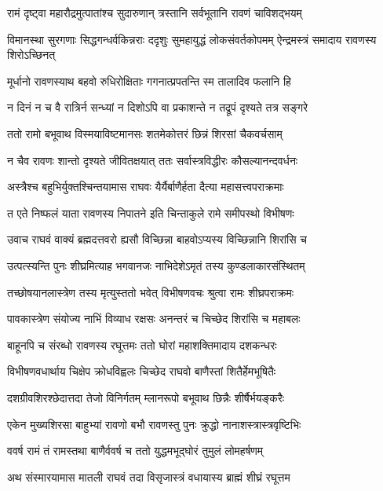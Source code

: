 \twolineshloka
{रामं दृष्ट्वा महारौद्रमुत्पातांश्च सुदारुणान्}
{त्रस्तानि सर्वभूतानि रावणं चाविशद्भयम्} %

\threelineshloka
{विमानस्था सुरगणाः सिद्धगन्धर्वकिन्नराः}
{ददृशुः सुमहायुद्धं लोकसंवर्तकोपमम्}
{ऐन्द्रमस्त्रं समादाय रावणस्य शिरोऽच्छिनत्} %

\twolineshloka
{मूर्धानो रावणस्याथ बहवो रुधिरोक्षिताः}
{गगनात्प्रपतन्ति स्म तालादिव फलानि हि} %

\twolineshloka
{न दिनं न च वै रात्रिर्न सन्ध्यां न दिशोऽपि वा}
{प्रकाशन्ते न तद्रूपं दृश्यते तत्र सङ्गरे} %

\twolineshloka
{ततो रामो बभूवाथ विस्मयाविष्टमानसः}
{शतमेकोत्तरं छिन्नं शिरसां चैकवर्चसाम्} %

\twolineshloka
{न चैव रावणः शान्तो दृश्यते जीवितक्षयात्}
{ततः सर्वास्त्रविद्धीरः कौसल्यानन्दवर्धनः} %

\twolineshloka
{अस्त्रैश्च बहुभिर्युक्तश्चिन्तयामास राघवः}
{यैर्यैर्बाणैर्हता दैत्या महासत्त्वपराक्रमाः} %

\twolineshloka
{त एते निष्फलं याता रावणस्य निपातने}
{इति चिन्ताकुले रामे समीपस्थो विभीषणः} %

\twolineshloka
{उवाच राघवं वाक्यं ब्रह्मदत्तवरो ह्यसौ}
{विच्छिन्ना बाहवोऽप्यस्य विच्छिन्नानि शिरांसि च} %

\twolineshloka
{उत्पत्स्यन्ति पुनः शीघ्रमित्याह भगवानजः}
{नाभिदेशेऽमृतं तस्य कुण्डलाकारसंस्थितम्} %

\twolineshloka
{तच्छोषयानलास्त्रेण तस्य मृत्युस्ततो भवेत्}
{विभीषणवचः श्रुत्वा रामः शीघ्रपराक्रमः} %

\twolineshloka
{पावकास्त्रेण संयोज्य नाभिं विव्याध रक्षसः}
{अनन्तरं च चिच्छेद शिरांसि च महाबलः} %

\twolineshloka
{बाहूनपि च संरब्धो रावणस्य रघूत्तमः}
{ततो घोरां महाशक्तिमादाय दशकन्धरः} %

\twolineshloka
{विभीषणवधार्थाय चिक्षेप क्रोधविह्वलः}
{चिच्छेद राघवो बाणैस्तां शितैर्हेमभूषितैः} %

\twolineshloka
{दशग्रीवशिरश्छेदात्तदा तेजो विनिर्गतम्}
{म्लानरूपो बभूवाथ छिन्नैः शीर्षैर्भयङ्करैः} %

\twolineshloka
{एकेन मुख्यशिरसा बाहुभ्यां रावणो बभौ}
{रावणस्तु पुनः क्रुद्धो नानाशस्त्रास्त्रवृष्टिभिः} %

\twolineshloka
{ववर्ष रामं तं रामस्तथा बाणैर्ववर्ष च}
{ततो युद्धमभूद्\mbox{}घोरं तुमुलं लोमहर्षणम्} %

\twolineshloka
{अथ संस्मारयामास मातली राघवं तदा}
{विसृजास्त्रं वधायास्य ब्राह्मं शीघ्रं रघूत्तम} %

